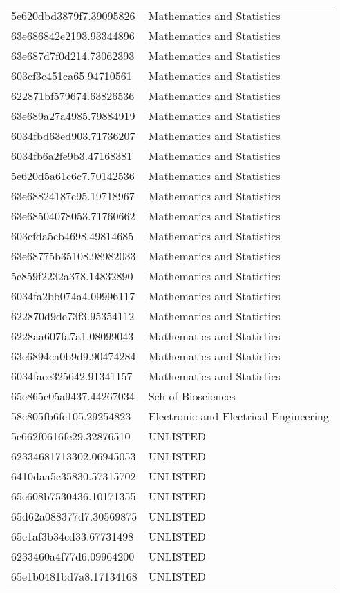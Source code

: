 \begin{tabular}{ll}
5e620dbd3879f7.39095826 & Mathematics and Statistics \\
63e686842e2193.93344896 & Mathematics and Statistics \\
63e687d7f0d214.73062393 & Mathematics and Statistics \\
603cf3c451ca65.94710561 & Mathematics and Statistics \\
622871bf579674.63826536 & Mathematics and Statistics \\
63e689a27a4985.79884919 & Mathematics and Statistics \\
6034fbd63ed903.71736207 & Mathematics and Statistics \\
6034fb6a2fe9b3.47168381 & Mathematics and Statistics \\
5e620d5a61c6c7.70142536 & Mathematics and Statistics \\
63e68824187c95.19718967 & Mathematics and Statistics \\
63e68504078053.71760662 & Mathematics and Statistics \\
603cfda5cb4698.49814685 & Mathematics and Statistics \\
63e68775b35108.98982033 & Mathematics and Statistics \\
5c859f2232a378.14832890 & Mathematics and Statistics \\
6034fa2bb074a4.09996117 & Mathematics and Statistics \\
622870d9de73f3.95354112 & Mathematics and Statistics \\
6228aa607fa7a1.08099043 & Mathematics and Statistics \\
63e6894ca0b9d9.90474284 & Mathematics and Statistics \\
6034face325642.91341157 & Mathematics and Statistics \\
65e865c05a9437.44267034 & Sch of Biosciences \\
58c805fb6fe105.29254823 & Electronic and Electrical Engineering \\
5e662f0616fe29.32876510 & UNLISTED \\
62334681713302.06945053 & UNLISTED \\
6410daa5c35830.57315702 & UNLISTED \\
65e608b7530436.10171355 & UNLISTED \\
65d62a088377d7.30569875 & UNLISTED \\
65e1af3b34cd33.67731498 & UNLISTED \\
6233460a4f77d6.09964200 & UNLISTED \\
65e1b0481bd7a8.17134168 & UNLISTED \\

\end{tabular}
